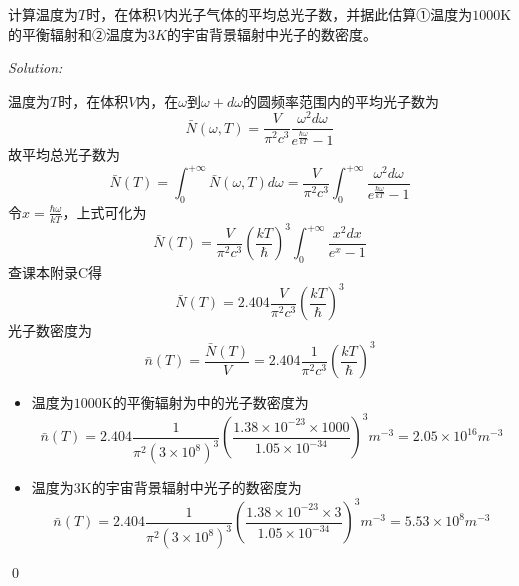 \documentclass[12pt,a4paper]{article}
\newenvironment{problem}[2][Problem]{\begin{trivlist}
\item[\hskip \labelsep {\bfseries #1}\hskip \labelsep {\bfseries #2.}]}{\end{trivlist}}
\newenvironment{sol}
    {\emph{Solution:}
    }
    {
    \qed
    }
\begin{document}
\begin{problem}{8.7}
计算温度为$T$时，在体积$V$内光子气体的平均总光子数，并据此估算①温度为$1000$K的平衡辐射和②温度为$3K$的宇宙背景辐射中光子的数密度。
\end{problem}
\begin{sol}
温度为$T$时，在体积$V$内，在$\omega$到$\omega+d\omega$的圆频率范围内的平均光子数为
\begin{equation}
\bar{N}(\omega,T)=\frac{V}{\pi^2c^3}\frac{\omega^2d\omega}{e^{\frac{\hbar\omega}{kT}}-1}
\end{equation}
故平均总光子数为
\begin{equation}
\bar{N}(T)=\int_0^{+\infty}\bar{N}(\omega,T)d\omega=\frac{V}{\pi^2c^3}\int_0^{+\infty}\frac{\omega^2d\omega}{e^{\frac{\hbar\omega}{kT}}-1}
\end{equation}
令$x=\frac{\hbar\omega}{kT}$，上式可化为
\begin{equation}
\bar{N}(T)=\frac{V}{\pi^2c^3}\left(\frac{kT}{\hbar}\right)^3\int_0^{+\infty}\frac{x^2dx}{e^x-1}
\end{equation}
查课本附录C得
\begin{equation}
\bar{N}(T)=2.404\frac{V}{\pi^2c^3}\left(\frac{kT}{\hbar}\right)^3
\end{equation}
光子数密度为
\begin{equation}
\bar{n}(T)=\frac{\bar{N}(T)}{V}=2.404\frac{1}{\pi^2c^3}\left(\frac{kT}{\hbar}\right)^3
\end{equation}
\begin{itemize}
\item[①] 温度为$1000$K的平衡辐射为中的光子数密度为
\begin{equation}
\bar{n}(T)=2.404\frac{1}{\pi^2(3\times10^8)^3}\left(\frac{1.38\times10^{-23}\times1000}{1.05\times10^{-34}}\right)^3m^{-3}=2.05\times10^{16}m^{-3}
\end{equation}
\item[②] 温度为$3$K的宇宙背景辐射中光子的数密度为
\begin{equation}
\bar{n}(T)=2.404\frac{1}{\pi^2(3\times10^8)^3}\left(\frac{1.38\times10^{-23}\times3}{1.05\times10^{-34}}\right)^3m^{-3}=5.53\times10^8m^{-3}
\end{equation}
\end{itemize}
\end{sol}
\end{document}

